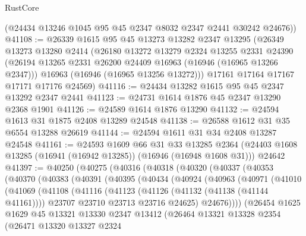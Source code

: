 \begin{lexlean}{RustCore}
\begin{coremodule}
      (@24434 @13246 @1045 @95 @45 @2347 @8032 @2347 @2441 @30242 @24676))
@41108 := @26339
    @1615
    @95
    @45
    @13273
    @13282
    @2347
    @13295
    (@26349
      @13273
      @13280
      @2414
      (@26180
        @13272
        @13279
        @2324
        @13255
        @2331
        @24390
        (@26194 @13265 @2331 @26200 @24409 @16963 (@16946 (@16965 @13266 @2347)))
        @16963
        (@16946 (@16965 @13256 @13272)))
      @17161
      @17164
      @17167
      @17171
      @17176
      @24569)
@41116 := @24434 @13282 @1615 @95 @45 @2347 @13292 @2347 @2441
@41123 := @24731 @1614 @1876 @45 @2347 @13290 @2368 @1901
@41126 := @24589 @1614 @1876 @13290
@41132 := @24594 @1613 @31 @1875 @2408 @13289 @24548
@41138 := @26588 @1612 @31 @35 @6554 @13288 @26619
@41144 := @24594 @1611 @31 @34 @2408 @13287 @24548
@41161 := @24593
    @1609
    @66
    @31
    @33
    @13285
    @2364
    (@24403 @1608 @13285 (@16941 (@16942 @13285)) (@16946 (@16948 @1608 @31)))
    @24642
@41397 := @40250
    (@40275
      (@40316
        (@40318
          (@40320
            (@40337
              (@40353
                (@40370
                  (@40383
                    (@40391
                      (@40395
                        (@40434
                          (@40924
                            (@40963
                              (@40971
                                (@41010
                                  (@41069
                                    (@41108
                                      (@41116
                                        (@41123
                                          (@41126 (@41132 (@41138 (@41144 @41161))))
                                          @23707
                                          @23710
                                          @23713
                                          @23716
                                          @24625)
                                        @24676))))
                                (@26454
                                  @1625
                                  @1629
                                  @45
                                  @13321
                                  @13330
                                  @2347
                                  @13412
                                  (@26464
                                    @13321
                                    @13328
                                    @2354
                                    (@26471
                                      @13320
                                      @13327
                                      @2324

\end{coremodule}
\end{lexlean}
